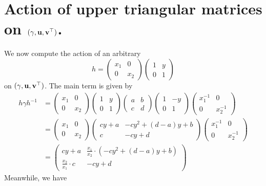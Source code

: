 \section{Action of upper triangular matrices on $(\gamma, \mathbf u, \mathbf v^\top)$.}
We now compute the action of an arbitrary
\[ h = \begin{pmatrix} x_1 & 0 \\ 0 & x_2 \end{pmatrix}
  \begin{pmatrix} 1 & y \\ 0 & 1 \end{pmatrix} \]
on $(\gamma, \mathbf u, \mathbf v^\top)$.
The main term is given by
\begin{align*}
  h \gamma h^{-1}
  &=
  \begin{pmatrix} x_1 & 0 \\ 0 & x_2 \end{pmatrix}
  \begin{pmatrix} 1 & y \\ 0 & 1 \end{pmatrix}
  \begin{pmatrix} a & b \\ c & d \end{pmatrix}
  \begin{pmatrix} 1 & -y \\ 0 & 1 \end{pmatrix}
  \begin{pmatrix} x_1^{-1} & 0 \\ 0 & x_2^{-1} \end{pmatrix} \\
  &=
  \begin{pmatrix} x_1 & 0 \\ 0 & x_2 \end{pmatrix}
  \begin{pmatrix} cy + a & -cy^2+(d-a)y+b \\ c & -cy+d \end{pmatrix}
  \begin{pmatrix} x_1^{-1} & 0 \\ 0 & x_2^{-1} \end{pmatrix} \\
  &=
  \begin{pmatrix} cy + a & \frac{x_1}{x_2} \cdot \left( -cy^2+(d-a)y+b \right) \\
    \frac{x_2}{x_1} \cdot c & -cy+d \end{pmatrix}
\end{align*}
Meanwhile, we have
